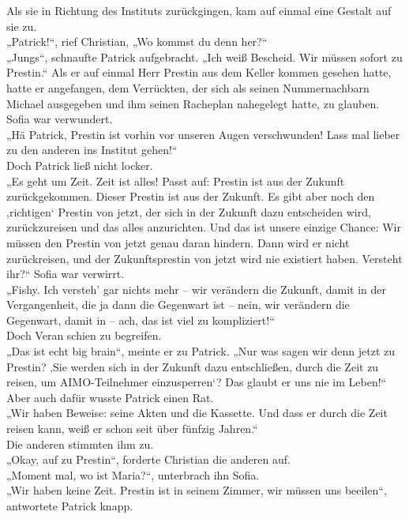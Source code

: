 \documentclass[oneside]{memoir}
\begin{document}
\bigskip
\noindent Als sie in Richtung des Instituts zurückgingen, kam auf einmal eine Gestalt auf sie zu. \\
„Patrick!“, rief Christian, „Wo kommst du denn her?“ \\
„Jungs“, schnaufte Patrick aufgebracht. „Ich weiß Bescheid. Wir müssen sofort zu Prestin.“ Als er auf einmal Herr Prestin aus dem Keller kommen gesehen hatte, hatte er angefangen, dem Verrückten, der sich als seinen Nummernachbarn Michael ausgegeben und ihm seinen Racheplan nahegelegt hatte, zu glauben. \\
Sofia war verwundert. \\
„Hä Patrick, Prestin ist vorhin vor unseren Augen verschwunden! Lass mal lieber zu den anderen ins Institut gehen!“ \\
Doch Patrick ließ nicht locker. \\
„Es geht um Zeit. Zeit ist alles! Passt auf: Prestin ist aus der Zukunft zurückgekommen. Dieser Prestin ist aus der Zukunft. Es gibt aber noch den ‚richtigen‘ Prestin von jetzt, der sich in der Zukunft dazu entscheiden wird, zurückzureisen und das alles anzurichten. Und das ist unsere einzige Chance: Wir müssen den Prestin von jetzt genau daran hindern. Dann wird er nicht zurückreisen, und der Zukunftsprestin von jetzt wird nie existiert haben. Versteht ihr?“
Sofia war verwirrt. \\
„Fishy. Ich versteh' gar nichts mehr – wir verändern die Zukunft, damit in der Vergangenheit, die ja dann die Gegenwart ist – nein, wir verändern die Gegenwart, damit in – ach, das ist viel zu kompliziert!“ \\
Doch Veran schien zu begreifen. \\
„Das ist echt big brain“, meinte er zu Patrick. „Nur was sagen wir denn jetzt zu Prestin? ‚Sie werden sich in der Zukunft dazu entschließen, durch die Zeit zu reisen, um AIMO-Teilnehmer einzusperren‘? Das glaubt er uns nie im Leben!“ \\
Aber auch dafür wusste Patrick einen Rat. \\
„Wir haben Beweise: seine Akten und die Kassette. Und dass er durch die Zeit reisen kann, weiß er schon seit über fünfzig Jahren.“ \\
Die anderen stimmten ihm zu. \\
„Okay, auf zu Prestin“, forderte Christian die anderen auf. \\
„Moment mal, wo ist Maria?“, unterbrach ihn Sofia. \\
„Wir haben keine Zeit. Prestin ist in seinem Zimmer, wir müssen uns beeilen“, antwortete Patrick knapp. \\
\end{document}
